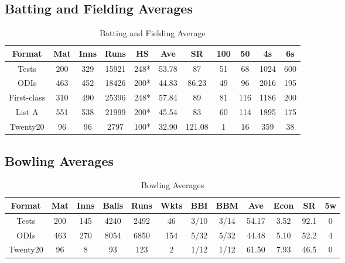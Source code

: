 \documentclass[12pt,twocolumn ]{article}
\begin{document}
\subsection{Batting and Fielding Averages}
\begin{table}[h]
    \centering
    \begin{tabular}{|c|c|c|c|c|c|c|c|c|c|c|}
     \hline
     Format & Mat & Inns & Runs & HS & Ave & SR & 100 & 50 & 4s & 6s  \\
     \hline
     Tests & 200 & 329 & 15921 & 248* & 53.78 & 87 & 51 & 68 & 1024 & 600 \\
     \hline
     ODIs & 463 & 452 & 18426 & 200* & 44.83 & 86.23 & 49 & 96 & 2016 & 195\\
     \hline
     First-class & 310 & 490 & 25396 & 248* & 57.84 & 89 & 81 & 116 & 1186 & 200\\
     \hline
     List A & 551 & 538 & 21999 & 200* & 45.54 &83& 60 & 114 & 1895 & 175\\
     \hline
     Twenty20 & 96  & 96 & 2797 & 100* & 32.90 & 121.08 & 1 & 16 & 359 & 38\\
     \hline
\end{tabular}
    \caption{Batting and Fielding Average}
    \label{tab:my_label}
\end{table}
\subsection{Bowling Averages}
\begin{table}[h]
    \centering
    \begin{tabular}{|c|c|c|c|c|c|c|c|c|c|c|c|}
    \hline
     Format & Mat &	Inns &	Balls &	Runs &	Wkts &	BBI &	BBM &	Ave &	Econ &	SR & 5w \\
     \hline
      Tests & 200 &	145 & 4240 & 2492 &	46 & 3/10 &	3/14 & 54.17 & 3.52 &	92.1 & 0 \\
      \hline
      ODIs & 463 & 270 & 8054 & 6850 & 154 & 5/32 & 5/32 & 44.48 & 5.10 & 52.2 & 4 \\
      \hline
      Twenty20 & 96 &	8 &	93 &	123 &	2 &	1/12 &	1/12 &	61.50 &	7.93 &	46.5 &	0 \\
      \hline
\end{tabular}
    \caption{Bowling Averages}
    \label{tab:my_label}
\end{table}
\end{document}
